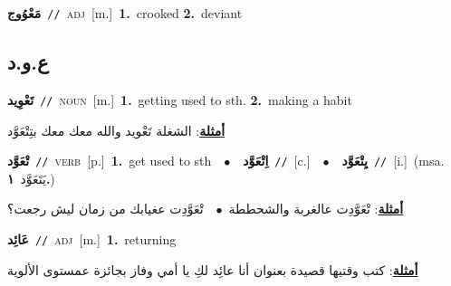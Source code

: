 \documentclass[10pt,a4paper,twoside]{article} %
\begin{document}
\begin{multicols}{2}
{\setlength\topsep{0pt}\textbf{\foreignlanguage{arabic}{مَعْوُوج}}\ {\color{gray}\texttt{//}\color{black}}\ \textsc{adj}\ [m.]\ \textbf{1.}~crooked  \textbf{2.}~deviant\ } \vspace{2mm}

\vspace{-3mm}
\subsection*{\color{blue}\foreignlanguage{arabic}{ع.و.د}\color{blue}{}} 

{\setlength\topsep{0pt}\textbf{\foreignlanguage{arabic}{تَعْوِيد}}\ {\color{gray}\texttt{//}\color{black}}\ \textsc{noun}\ [m.]\ \textbf{1.}~getting used to sth.  \textbf{2.}~making a habit\  \begin{flushright}\color{gray}\foreignlanguage{arabic}{\textbf{\underline{\foreignlanguage{arabic}{أمثلة}}}: الشغلة تَعْويد والله معك معك بتِتْعَوَّد}\end{flushright}\color{black}} \vspace{2mm}

{\setlength\topsep{0pt}\textbf{\foreignlanguage{arabic}{تْعَوَّد}}\ {\color{gray}\texttt{//}\color{black}}\ \textsc{verb}\ [p.]\ \textbf{1.}~get used to sth\ \ $\bullet$\ \ \setlength\topsep{0pt}\textbf{\foreignlanguage{arabic}{اِتْعَوَّد}}\ {\color{gray}\texttt{//}\color{black}}\ [c.]\ \ $\bullet$\ \ \setlength\topsep{0pt}\textbf{\foreignlanguage{arabic}{يِتْعَوَّد}}\ {\color{gray}\texttt{//}\color{black}}\ [i.]\ \color{gray}(msa. \foreignlanguage{arabic}{يَتَعَوَّد}~\foreignlanguage{arabic}{\textbf{١.}})\color{black}\  \begin{flushright}\color{gray}\foreignlanguage{arabic}{\textbf{\underline{\foreignlanguage{arabic}{أمثلة}}}: تْعَوَّدِت عالغربة والشحططة\ $\bullet$\ \  تْعَوَّدِت عغيابك من زمان ليش رجعت؟}\end{flushright}\color{black}} \vspace{2mm}

{\setlength\topsep{0pt}\textbf{\foreignlanguage{arabic}{عَائِد}}\ {\color{gray}\texttt{//}\color{black}}\ \textsc{adj}\ [m.]\ \textbf{1.}~returning\  \begin{flushright}\color{gray}\foreignlanguage{arabic}{\textbf{\underline{\foreignlanguage{arabic}{أمثلة}}}: كتب وقتيها قصيدة بعنوان أنا عائِد لكِ يا أمي وفاز بجائزة عمستوى الألوية}\end{flushright}\color{black}} \vspace{2mm}


\end{multicols}
\end{document}
